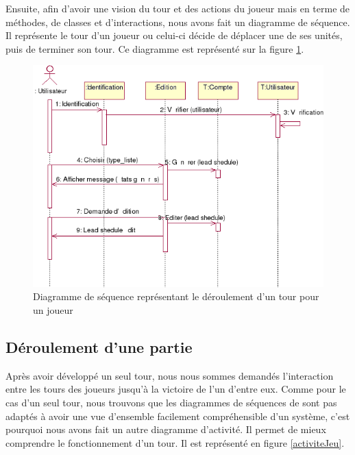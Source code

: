 Ensuite, afin d'avoir une vision du tour et des actions du joueur mais en terme de méthodes, de classes et d'interactions, nous avons fait un diagramme de séquence. Il représente le tour d'un joueur ou celui-ci décide de déplacer une de ses unités, puis de terminer son tour. Ce diagramme est représenté sur la figure \ref{sequenceTour}.\\

\begin{figure}[!h] 
\centerline{\includegraphics[scale=0.30]{img/sequence_tour_ex.png}}
   \caption{\label{étiquette} Diagramme de séquence représentant le déroulement d'un tour pour un joueur}
\label{sequenceTour}
\end{figure}

\subsection{Déroulement d'une partie}
Après avoir développé un seul tour, nous nous sommes demandés l'interaction entre les tours des joueurs jusqu'à la victoire de l'un d'entre eux. Comme pour le cas d'un seul tour, nous trouvons que les diagrammes de séquences de sont pas adaptés à avoir une vue d'ensemble facilement compréhensible d'un système, c'est pourquoi nous avons fait un autre diagramme d'activité. Il permet de mieux comprendre le fonctionnement d'un tour. Il est représenté en figure \ref{activiteJeu}.\\


